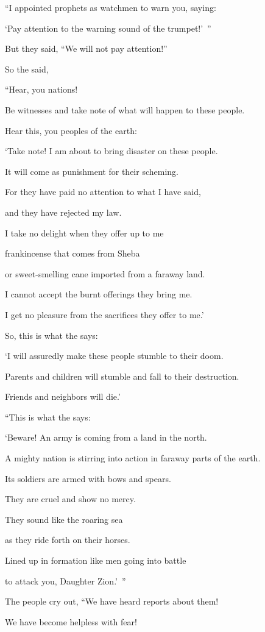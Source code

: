 {\par }{\Q “I appointed
prophets as watchmen
to warn
you, saying:
\par }{\Q ‘Pay attention
to the warning
sound
of the trumpet!’ ”

\par }{\Q But they said,
“We will not
pay attention!”
\par }{\PP {}So
the
{} said,

\par }{\Q “Hear,
you nations!
\par }{\Q Be witnesses
and take note of what will happen to these people.
\par }{\Q {}Hear
this,
you peoples of the earth:

\par }{\Q ‘Take note! I am
about to bring
disaster
on these people.
\par }{\Q It will come as punishment for their scheming.
\par }{\Q For
they have paid
no
attention
to what I have said,

\par }{\Q and they have rejected
my law.
\par }{\Q {}I take no delight
when they offer up to me

\par }{\Q frankincense
that
comes
from Sheba
\par }{\Q or sweet-smelling
cane imported
from a faraway
land.
\par }{\Q I cannot accept the burnt offerings
they bring me.
\par }{\Q I get no
pleasure
from the sacrifices they offer to me.’
\par }{\Q {}So,
this
is what the
{}
says:
\par }{\Q ‘I will assuredly
make
these
people
stumble
to
their doom.

\par }{\Q Parents
and children
will stumble
and fall
to their destruction.

\par }{\Q Friends
and neighbors
will die.’
\par }{\Q {}“This is what
the {}
says:
\par }{\Q ‘Beware! An army
is coming
from a land
in the north.
\par }{\Q A mighty nation
is stirring into action
in faraway parts
of the earth.
\par }{\Q {}Its soldiers are armed
with bows
and spears.
\par }{\Q They are
cruel
and show no
mercy.
\par }{\Q They sound
like the roaring
sea
\par }{\Q as they ride
forth on
their
horses.
\par }{\Q Lined
up
in formation
like men
going
into battle
\par }{\Q to attack
you, Daughter
Zion.’ ”
\par }{\Q {}The people cry out, “We have heard
reports
about them!
\par }{\Q We have become helpless
with fear!

}
